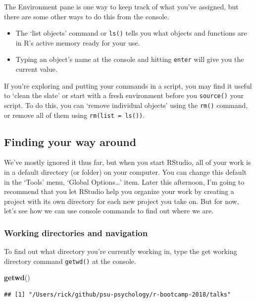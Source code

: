 \documentclass[]{article}
\newenvironment{Shaded}{\begin{snugshade}}{\end{snugshade}}
\newcommand{\KeywordTok}[1]{\textcolor[rgb]{0.13,0.29,0.53}{\textbf{#1}}}
\newcommand{\NormalTok}[1]{#1}
\providecommand{\tightlist}{%
  \setlength{\itemsep}{0pt}\setlength{\parskip}{0pt}}
\begin{document}
The Environment pane is one way to keep track of what you've assigned,
but there are some other ways to do this from the console.

\begin{itemize}
\tightlist
\item
  The `list objects' command or \texttt{ls()} tells you what objects and
  functions are in R's active memory ready for your use.
\item
  Typing an object's name at the console and hitting \texttt{enter} will
  give you the current value.
\end{itemize}

If you're exploring and putting your commands in a script, you may find
it useful to `clean the slate' or start with a fresh environment before
you \texttt{source()} your script. To do this, you can `remove
individual objects' using the \texttt{rm()} command, or remove all of
them using \texttt{rm(list\ =\ ls())}.

\subsection{Finding your way around}\label{finding-your-way-around}

We've mostly ignored it thus far, but when you start RStudio, all of
your work is in a default directory (or folder) on your computer. You
can change this default in the `Tools' menu, `Global Options\ldots{}'
item. Later this afternoon, I'm going to recommend that you let RStudio
help you organize your work by creating a project with its own directory
for each new project you take on. But for now, let's see how we can use
console commands to find out where we are.

\subsubsection{Working directories and
navigation}\label{working-directories-and-navigation}

To find out what directory you're currently working in, type the get
working directory command \texttt{getwd()} at the console.

\begin{Shaded}
\begin{Highlighting}[]
\KeywordTok{getwd}\NormalTok{()}
\end{Highlighting}
\end{Shaded}

\begin{verbatim}
## [1] "/Users/rick/github/psu-psychology/r-bootcamp-2018/talks"
\end{verbatim}
\end{document}
